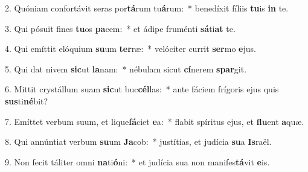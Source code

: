 2. Quóniam confortávit seras por\textbf{tá}rum tu\textbf{á}rum:~*  benedíxit fíliis \textbf{tu}is \textbf{in} te.\

3. Qui pósuit fines \textbf{tu}os \textbf{pa}cem:~*  et ádipe fruménti \textbf{sá}ti\textbf{at} te.\

4. Qui emíttit elóquium \textbf{su}um \textbf{ter}ræ:~*  velóciter currit \textbf{ser}mo \textbf{e}jus.\

5. Qui dat nivem \textbf{sic}ut \textbf{la}nam:~*  nébulam sicut \textbf{cí}nerem \textbf{spar}git.\

6. Mittit crystállum suam \textbf{sic}ut buc\textbf{cél}las:~*  ante fáciem frígoris ejus quis \textbf{sus}ti\textbf{né}bit?\

7. Emíttet verbum suum, et lique\textbf{fá}ciet \textbf{e}a:~*  flabit spíritus ejus, et \textbf{flu}ent \textbf{a}quæ.\

8. Qui annúntiat verbum \textbf{su}um \textbf{Ja}cob:~*  justítias, et judícia \textbf{su}a \textbf{Is}raël.\

9. Non fecit táliter omni \textbf{na}ti\textbf{ó}ni:~*  et judícia sua non manifes\textbf{tá}vit \textbf{e}is.\

